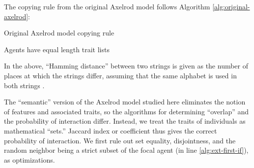 The copying rule from the original Axelrod model follows Algorithm \ref{alg:original-axelrod}:

\begin{algorithm}[H]
	\caption{Original Axelrod model copying rule}
	\label{alg:original-axelrod}
	\begin{boxedminipage}{\textwidth}
	\begin{algorithmic}[1]
		\REQUIRE Agents have equal length trait lists

		\ENDIF


	\end{algorithmic}
	\end{boxedminipage}
\end{algorithm}

In the above, ``Hamming distance'' between two strings is given as the number of places at which the strings differ, assuming that the same alphabet is used in both strings \citep{hamming1950error}.  

The ``semantic'' version of the Axelrod model studied here eliminates the notion of features and associated traits, so the algorithms for determining ``overlap'' and the probability of interaction differ.  Instead, we treat the traits of individuals as mathematical ``sets.''  Jaccard index or coefficient thus gives the correct probability of interaction.  We first rule out set equality, disjointness, and the random neighbor being a strict subset of the focal agent (in line \ref{alg:ext-first-if}), as optimizations.    





